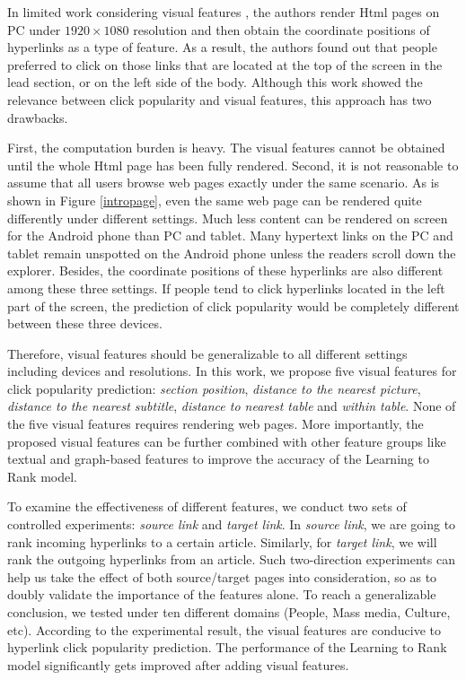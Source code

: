 In limited work considering visual features \cite{dimitrov2016visual, dimitrov2017makes}, the authors render Html pages on PC under $1920 \times 1080$ resolution and then obtain the coordinate positions of hyperlinks as a type of feature. As a result, the authors found out that people preferred to click on those links that are located at the top of the screen in the lead section, or on the left side of the body. Although this work showed the relevance between click popularity and visual features, this approach has two drawbacks.

First, the computation burden is heavy. The visual features cannot be obtained until the whole Html page has been fully rendered. Second, it is not reasonable to assume that all users browse web pages exactly under the same scenario. As is shown in Figure \ref{intropage}, even the same web page can be rendered quite differently under different settings. Much less content can be rendered on screen for the Android phone than PC and tablet. Many hypertext links on the PC and tablet remain unspotted on the Android phone unless the readers scroll down the explorer. Besides, the coordinate positions of these hyperlinks are also different among these three settings. If people tend to click hyperlinks located in the left part of the screen, the prediction of click popularity would be completely different between these three devices.

Therefore, visual features should be generalizable to all different settings including devices and resolutions. In this work, we propose five visual features for click popularity prediction: \emph{section position}, \emph{distance to the nearest picture}, \emph{distance to the nearest subtitle}, \emph{distance to nearest table} and \emph{within table}. None of the five visual features requires rendering web pages. More importantly, the proposed visual features can be further combined with other feature groups like textual and graph-based features \cite{thruesen2016link, dimitrov2017makes} to improve the accuracy of the Learning to Rank model.

To examine the effectiveness of different features, we conduct two sets of controlled experiments: \emph{source link} and \emph{target link}. In \emph{source link}, we are going to rank incoming hyperlinks to a certain article. Similarly, for \emph{target link}, we will rank the outgoing hyperlinks from an article. Such two-direction experiments can help us take the effect of both source/target pages into consideration, so as to doubly validate the importance of the features alone. To reach a generalizable conclusion, we tested under ten different domains (People, Mass media, Culture, etc). According to the experimental result, the visual features are conducive to hyperlink click popularity prediction. The performance of the Learning to Rank model significantly gets improved after adding visual features.

